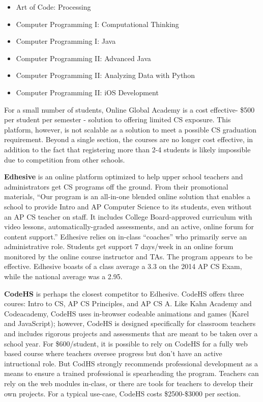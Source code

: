\begin{itemize}
\item Art of Code: Processing
\item Computer Programming I: Computational Thinking
\item Computer Programming I: Java
\item Computer Programming II: Advanced Java
\item Computer Programming II: Analyzing Data with Python
\item Computer Programming II: iOS Development
\end{itemize}
For a small number of students, Online Global Academy is a cost effective- \$500 per student per semester - solution to offering limited CS exposure. This platform, however, is not scalable as a solution to meet a possible CS graduation requirement. Beyond a single section, the courses are no longer cost effective, in addition to the fact that registering more than 2-4 students is likely impossible due to competition from other schools.\par
\textbf{Edhesive} is an online platform optimized to help upper school teachers and administrators get CS programs off the ground. From their promotional materials, ``Our program is an all-in-one blended online solution that enables a school to provide Intro and AP Computer Science to its students, even without an AP CS teacher on staff. It includes College Board-approved curriculum with video lessons, automatically-graded assessments, and an active, online forum for content support.'' Edhesive relies on in-class ``coaches'' who primarily serve an administrative role. Students get support 7 days/week in an online forum monitored by the online course instructor and TAs. The program appears to be effective. Edhesive boasts of a class average a 3.3 on the 2014 AP CS Exam, while the national average was a 2.95.\par
\textbf{CodeHS} is perhaps the closest competitor to Edhesive. CodeHS offers three coures: Intro to CS, AP CS Principles, and AP CS A. Like Kahn Academy and Codeacademy, CodeHS uses in-browser codeable animations and games (Karel and JavaScript); however, CodeHS is designed specifically for classroom teachers and includes rigorous projects and assessments that are meant to be taken over a school year. For \$600/student, it is possible to rely on CodeHS for a fully web based course where teachers oversee progress but don't have an active intructional role. But CodHS strongly recommends professional development as a means to ensure a trained professional is spearheading the program. Teachers can rely on the web modules in-class, or there are tools for teachers to develop their own projects. For a typical use-case, CodeHS costs \$2500-\$3000 per section.  \par
